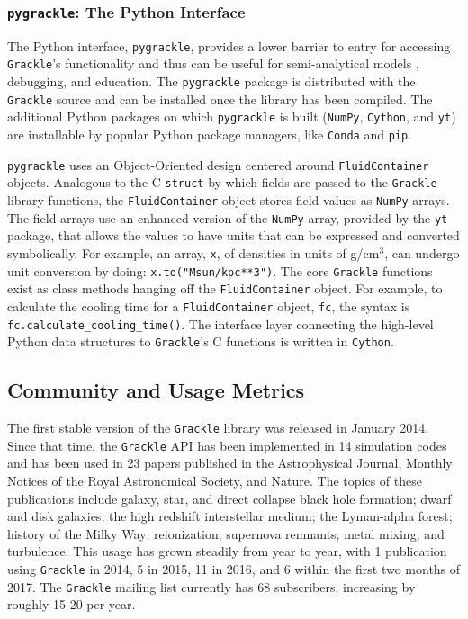 \documentclass[11pt]{article}
\newcommand{\grackle}{\texttt{Grackle}}
\newcommand{\yt}{\texttt{yt}}
\begin{document}
\begin{flushleft}
\subsubsection{\texttt{pygrackle}: The Python Interface}

The Python interface, \texttt{pygrackle}, provides a lower barrier to
entry for accessing \grackle{}'s functionality and thus can be
useful for semi-analytical models \citep[e.g.,][]{2016ApJ...820...71C,
2016MNRAS.459.4209A}, debugging, and education.  The
\texttt{pygrackle} package is distributed with the \grackle{} source
and can be installed once the library has been compiled.  The
additional Python packages on which \texttt{pygrackle} is built
(\texttt{NumPy}, \texttt{Cython}, and \yt{}) are
installable by popular Python package managers, like \texttt{Conda}
and \texttt{pip}.

\texttt{pygrackle} uses an Object-Oriented design centered around
\texttt{FluidContainer} objects.  Analogous to the C \texttt{struct}
by which fields are passed to the \grackle{} library functions, the
\texttt{FluidContainer} object stores field values as \texttt{NumPy}
arrays.  The field arrays use an enhanced version of the
\texttt{NumPy} array, provided by the \yt{} package, that allows
the values to have units that can be expressed and converted
symbolically.  For example, an array, \texttt{x}, of densities in units of
g/cm$^{3}$, can undergo unit conversion by doing:
\texttt{x.to("Msun/kpc**3")}.  The core \grackle{} functions exist as
class methods hanging off the \texttt{FluidContainer} object.  For
example, to calculate the cooling time for a \texttt{FluidContainer}
object, \texttt{fc}, the syntax is
\texttt{fc.calculate\_cooling\_time()}.  The interface layer
connecting the high-level Python data structures to \grackle{}'s C
functions is written in \texttt{Cython}.

\subsection{Community and Usage Metrics}

The first stable version of the \grackle{} library was released in
January 2014.  Since that time, the \grackle{} API has been
implemented in 14 simulation codes and has been used in 23 papers
published in the Astrophysical Journal, Monthly Notices of the Royal
Astronomical Society, and Nature.  The topics of these publications
include galaxy, star, and direct collapse black hole formation; dwarf
and disk galaxies; the high redshift interstellar medium; the
Lyman-alpha forest; history of the Milky Way; reionization; supernova
remnants; metal mixing; and turbulence.  This usage has grown steadily
from year to year, with 1 publication using \grackle{} in 2014, 5 in
2015, 11 in 2016, and 6 within the first two months of 2017.  The
\grackle{} mailing list currently has 68 subscribers, increasing by
roughly 15-20 per year.


\end{flushleft}
\end{document}
